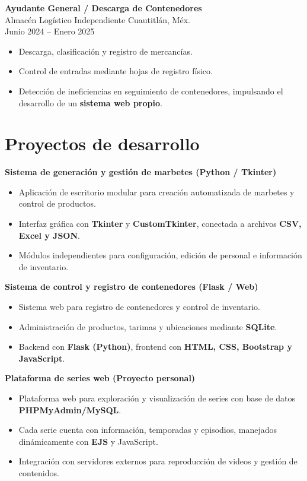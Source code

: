 \documentclass[11pt]{article}
\begin{document}
\textbf{Ayudante General / Descarga de Contenedores} \\
Almacén Logístico Independiente \hfill Cuautitlán, Méx. \\
Junio 2024 -- Enero 2025
\begin{itemize}[leftmargin=*, noitemsep]
    \item Descarga, clasificación y registro de mercancías.
    \item Control de entradas mediante hojas de registro físico.
    \item Detección de ineficiencias en seguimiento de contenedores, impulsando el desarrollo de un \textbf{sistema web propio}.
\end{itemize}

\vspace{6pt}

\section*{Proyectos de desarrollo}

\textbf{Sistema de generación y gestión de marbetes (Python / Tkinter)} 
\begin{itemize}[leftmargin=*, noitemsep]
    \item Aplicación de escritorio modular para creación automatizada de marbetes y control de productos.
    \item Interfaz gráfica con \textbf{Tkinter} y \textbf{CustomTkinter}, conectada a archivos \textbf{CSV, Excel y JSON}.
    \item Módulos independientes para configuración, edición de personal e información de inventario.
\end{itemize}

\textbf{Sistema de control y registro de contenedores (Flask / Web)} 
\begin{itemize}[leftmargin=*, noitemsep]
    \item Sistema web para registro de contenedores y control de inventario.
    \item Administración de productos, tarimas y ubicaciones mediante \textbf{SQLite}.
    \item Backend con \textbf{Flask (Python)}, frontend con \textbf{HTML, CSS, Bootstrap y JavaScript}.
\end{itemize}

\textbf{Plataforma de series web (Proyecto personal)}
\begin{itemize}[leftmargin=*, noitemsep]
    \item Plataforma web para exploración y visualización de series con base de datos \textbf{PHPMyAdmin/MySQL}.
    \item Cada serie cuenta con información, temporadas y episodios, manejados dinámicamente con \textbf{EJS} y JavaScript.
    \item Integración con servidores externos para reproducción de videos y gestión de contenidos.
\end{itemize}
\end{document}
